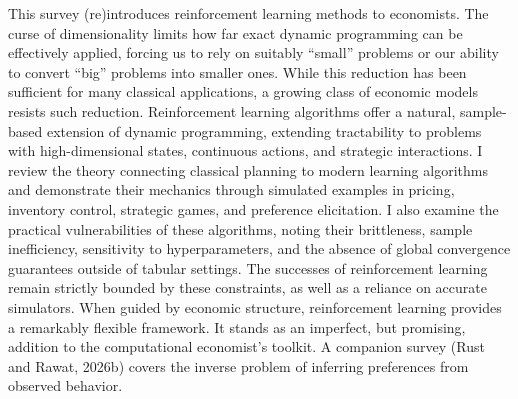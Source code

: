 This survey (re)introduces reinforcement learning methods to economists. The curse of dimensionality limits how far exact dynamic programming can be effectively applied, forcing us to rely on suitably “small” problems or our ability to convert “big” problems into smaller ones. While this reduction has been sufficient for many classical applications, a growing class of economic models resists such reduction. Reinforcement learning algorithms offer a natural, sample-based extension of dynamic programming, extending tractability to problems with high-dimensional states, continuous actions, and strategic interactions. I review the theory connecting classical planning to modern learning algorithms and demonstrate their mechanics through simulated examples in pricing, inventory control, strategic games, and preference elicitation. I also examine the practical vulnerabilities of these algorithms, noting their brittleness, sample inefficiency, sensitivity to hyperparameters, and the absence of global convergence guarantees outside of tabular settings. The successes of reinforcement learning remain strictly bounded by these constraints, as well as a reliance on accurate simulators. When guided by economic structure, reinforcement learning provides a remarkably flexible framework. It stands as an imperfect, but promising, addition to the computational economist's toolkit. A companion survey (Rust and Rawat, 2026b) covers the inverse problem of inferring preferences from observed behavior.
